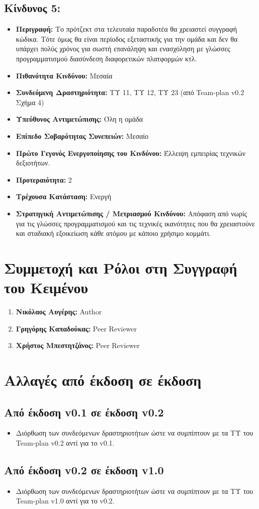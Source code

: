 \documentclass[12pt,a4paper]{article}
\begin{document}
\subsection*{Κίνδυνος 5:}
\begin{itemize}
	\item \textbf{Περιγραφή:} Το πρότζεκτ στα τελευταία παραδοτέα θα χρειαστεί συγγραφή κώδικα. Τότε όμως θα είναι περίοδος εξεταστικής για την ομάδα και δεν θα υπάρχει πολύς χρόνος για σωστή επανάληψη και ενασχόληση με γλώσσες προγραμματισμού διασύνδεση διαφορετικών πλατφορμών κτλ.
	\item \textbf{Πιθανότητα Κινδύνου:} Μεσαία
	\item \textbf{Συνδεόμενη Δραστηριότητα:} ΤΥ 11, ΤΥ 12, ΤΥ 23 (από Team-plan v0.2 Σχήμα 4)
	\item \textbf{Υπεύθυνος Αντιμετώπισης:} Όλη η ομάδα
	\item \textbf{Επίπεδο Σοβαρότητας Συνεπειών:} Μεσαίο
	\item \textbf{Πρώτο Γεγονός Ενεργοποίησης του Κινδύνου:} Έλλειψη εμπειρίας τεχνικών δεξιοτήτων.
	\item \textbf{Προτεραιότητα:} 2
	\item \textbf{Τρέχουσα Κατάσταση:} Ενεργή
	\item \textbf{Στρατηγική Αντιμετώπισης / Μετριασμού Κινδύνου:} Απόφαση από νωρίς για τις γλώσσες προγραμματισμού και τις τεχνικές ικανότητες που θα χρειαστούνε και σταδιακή εξοικείωση κάθε ατόμου με κάποιο χρήσιμο κομμάτι.
\end{itemize}

\section{Συμμετοχή και Ρόλοι στη Συγγραφή του Κειμένου}
\begin{enumerate}
	\item \textbf{Νικόλαος Αυγέρης:} Author
	\item \textbf{Γρηγόρης Καπαδούκας:} Peer Reviewer
	\item \textbf{Χρήστος Μπεστητζάνος:} Peer Reviewer
\end{enumerate}

\section{Αλλαγές από έκδοση σε έκδοση}

\subsection{Από έκδοση v0.1 σε έκδοση v0.2}
\begin{itemize}
    \item Διόρθωση των συνδεόμενων δραστηριοτήτων ώστε να συμπίπτουν με τα ΤΥ του Team-plan v0.2 αντί για το v0.1.
\end{itemize}

\subsection{Από έκδοση v0.2 σε έκδοση v1.0}
\begin{itemize}
    \item Διόρθωση των συνδεόμενων δραστηριοτήτων ώστε να συμπίπτουν με τα ΤΥ του Team-plan v1.0 αντί για το v0.2.
\end{itemize}
\end{document}
